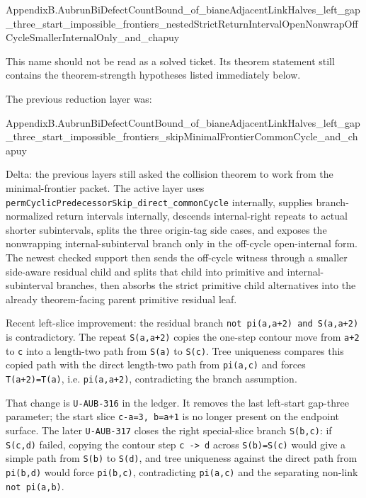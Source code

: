 \documentclass[
]{article}
\newenvironment{Shaded}{}{}
\newcommand{\NormalTok}[1]{#1}
\begin{document}
\begin{Shaded}
\begin{Highlighting}[]
\NormalTok{AppendixB.AubrunBiDefectCountBound\_of\_bianeAdjacentLinkHalves\_left\_gap\_three\_start\_impossible\_frontiers\_nestedStrictReturnIntervalOpenNonwrapOffCycleSmallerInternalOnly\_and\_chapuy}
\end{Highlighting}
\end{Shaded}

This name should not be read as a solved ticket. Its theorem statement
still contains the theorem-strength hypotheses listed immediately below.

The previous reduction layer was:

\begin{Shaded}
\begin{Highlighting}[]
\NormalTok{AppendixB.AubrunBiDefectCountBound\_of\_bianeAdjacentLinkHalves\_left\_gap\_three\_start\_impossible\_frontiers\_skipMinimalFrontierCommonCycle\_and\_chapuy}
\end{Highlighting}
\end{Shaded}

Delta: the previous layers still asked the collision theorem to work
from the minimal-frontier packet. The active layer uses
\texttt{permCyclicPredecessorSkip\_direct\_commonCycle} internally,
supplies branch-normalized return intervals internally, descends
internal-right repeats to actual shorter subintervals, splits the three
origin-tag side cases, and exposes the nonwrapping internal-subinterval
branch only in the off-cycle open-internal form. The newest checked
support then sends the off-cycle witness through a smaller side-aware
residual child and splits that child into primitive and
internal-subinterval branches, then absorbs the strict primitive child
alternatives into the already theorem-facing parent primitive residual
leaf.

Recent left-slice improvement: the residual branch
\texttt{not\ pi(a,a+2)\ and\ S(a,a+2)} is contradictory. The repeat
\texttt{S(a,a+2)} copies the one-step contour move from \texttt{a+2} to
\texttt{c} into a length-two path from \texttt{S(a)} to \texttt{S(c)}.
Tree uniqueness compares this copied path with the direct length-two
path from \texttt{pi(a,c)} and forces \texttt{T(a+2)=T(a)}, i.e.
\texttt{pi(a,a+2)}, contradicting the branch assumption.

That change is \texttt{U-AUB-316} in the ledger. It removes the last
left-start gap-three parameter; the start slice \texttt{c-a=3,\ b=a+1}
is no longer present on the endpoint surface. The later
\texttt{U-AUB-317} closes the right special-slice branch
\texttt{S(b,c)}: if \texttt{S(c,d)} failed, copying the contour step
\texttt{c\ -\textgreater{}\ d} across \texttt{S(b)=S(c)} would give a
simple path from \texttt{S(b)} to \texttt{S(d)}, and tree uniqueness
against the direct path from \texttt{pi(b,d)} would force
\texttt{pi(b,c)}, contradicting \texttt{pi(a,c)} and the separating
non-link \texttt{not\ pi(a,b)}.
\end{document}
